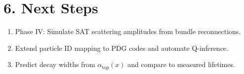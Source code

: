 \documentclass{article}
\begin{document}
\section*{6. Next Steps}

\begin{enumerate}
    \item Phase IV: Simulate SAT scattering amplitudes from bundle reconnections.
    \item Extend particle ID mapping to PDG codes and automate Q-inference.
    \item Predict decay widths from $\alpha_{\mathrm{top}}(x)$ and compare to measured lifetimes.
\end{enumerate}
\end{document}
